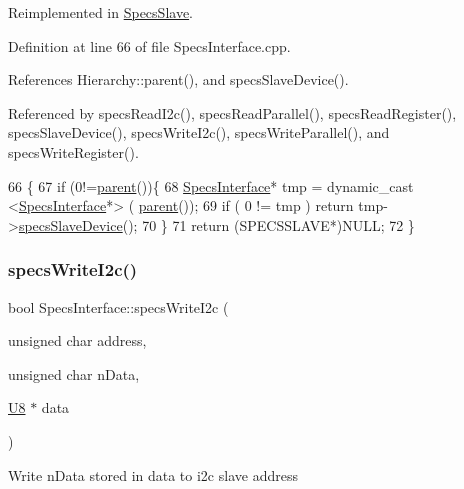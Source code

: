 Reimplemented in \hyperlink{classSpecsSlave_a44970aca61b6fdcd6d6d90e6601093f3}{Specs\+Slave}.



Definition at line 66 of file Specs\+Interface.\+cpp.



References Hierarchy\+::parent(), and specs\+Slave\+Device().



Referenced by specs\+Read\+I2c(), specs\+Read\+Parallel(), specs\+Read\+Register(), specs\+Slave\+Device(), specs\+Write\+I2c(), specs\+Write\+Parallel(), and specs\+Write\+Register().


\begin{DoxyCode}
66                                             \{
67     \textcolor{keywordflow}{if} (0!=\hyperlink{classHierarchy_a1c7bec8257e717f9c1465e06ebf845fc}{parent}())\{
68     \hyperlink{classSpecsInterface}{SpecsInterface}* tmp = dynamic\_cast <\hyperlink{classSpecsInterface}{SpecsInterface}*> (
      \hyperlink{classHierarchy_a1c7bec8257e717f9c1465e06ebf845fc}{parent}());
69     \textcolor{keywordflow}{if} ( 0 != tmp ) \textcolor{keywordflow}{return} tmp->\hyperlink{classSpecsInterface_ac8d4711197f484f055533ec1e5ae01a1}{specsSlaveDevice}();
70     \}
71   \textcolor{keywordflow}{return} (SPECSSLAVE*)NULL;
72 \}
\end{DoxyCode}
\mbox{\label{classSpecsInterface_a20dacf68396a40eadbb740db73ff9624}} 
\subsubsection{\texorpdfstring{specs\+Write\+I2c()}{specsWriteI2c()}\hspace{0.1cm}{\footnotesize\ttfamily [1/4]}}
{\footnotesize\ttfamily bool Specs\+Interface\+::specs\+Write\+I2c (\begin{DoxyParamCaption}\item[{unsigned char}]{address,  }\item[{unsigned char}]{n\+Data,  }\item[{\hyperlink{ICECALv3_8h_a3cb25ca6f51f003950f9625ff05536fc}{U8} $\ast$}]{data }\end{DoxyParamCaption})}

Write n\+Data stored in data to i2c slave address

